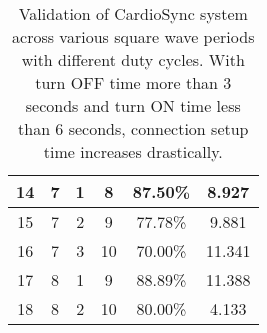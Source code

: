 \begin{table}[H]
\begin{tabular}{|c|c|c|c|c|c|}
14 & 7 & 1 & 8  & 87.50\% & 8.927  \\ \hline
15 & 7 & 2 & 9  & 77.78\% & 9.881  \\ \hline
16 & 7 & 3 & 10 & 70.00\% & 11.341 \\ \hline
17 & 8 & 1 & 9  & 88.89\% & 11.388 \\ \hline
18 & 8 & 2 & 10 & 80.00\% & 4.133  \\ \hline
\end{tabular}
\caption{Validation of CardioSync system across various square wave periods with different duty cycles. With turn OFF time more than 3 seconds and turn ON time less than 6 seconds, connection setup time increases drastically.}
\label{tab:cardiosync_intermittent_exp}
\end{table}